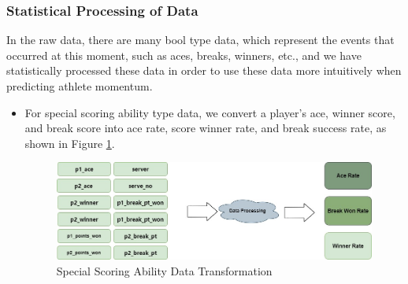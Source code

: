 \subsubsection{Statistical Processing of Data}
In the raw data, there are many bool type data, which represent the events that occurred at this moment, such as aces, breaks, winners, etc., and we have statistically processed these data in order to use these data more intuitively when predicting athlete momentum. 
\begin{itemize}
    \item For special scoring ability type data, we convert a player's ace, winner score, and break score into ace rate, score winner rate, and break success rate, as shown in Figure \ref{fig:Sdeal1}.
\begin{figure}[bt!]
    \centering
    \includegraphics[width=0.75\linewidth]{figure/特殊得分数据.jpg}
    \caption{\centering Special Scoring Ability Data Transformation}
    \label{fig:Sdeal1}
\end{figure}


\end{itemize}
